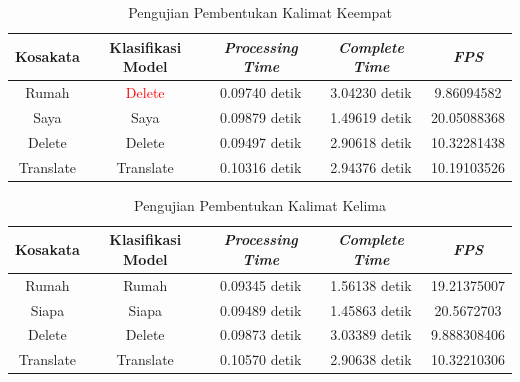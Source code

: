 \begin{longtable}{|c|c|c|c|c|}
  \caption{Pengujian Pembentukan Kalimat Keempat}
  \label{tb:prediksikombinasi4}                                   \\
  \hline
  \rowcolor[HTML]{C0C0C0}
  \textbf{Kosakata} & \textbf{Klasifikasi Model} & \textbf{\emph{Processing Time}} & \textbf{\emph{Complete Time}} & \textbf{\emph{FPS}}\\
  \hline
  Rumah             & \textcolor{red}{Delete}       & 0.09740 detik                           & 3.04230 detik                                  & 9.86094582\\
  Saya              & Saya                          & 0.09879 detik                           & 1.49619 detik                                  & 20.05088368\\
  Delete            & Delete                        & 0.09497 detik                           & 2.90618 detik                                  & 10.32281438\\
  Translate         & Translate                     & 0.10316 detik                           & 2.94376 detik                                  & 10.19103526\\
  \hline
\end{longtable}



\begin{longtable}{|c|c|c|c|c|}
  \caption{Pengujian Pembentukan Kalimat Kelima}
  \label{tb:prediksikombinasi5}                                   \\
  \hline
  \rowcolor[HTML]{C0C0C0}
  \textbf{Kosakata} & \textbf{Klasifikasi Model} & \textbf{\emph{Processing Time}} & \textbf{\emph{Complete Time}} & \textbf{\emph{FPS}}\\
  \hline
  Rumah             & Rumah                          & 0.09345 detik                           & 1.56138 detik                                  & 19.21375007\\
  Siapa             & Siapa                          & 0.09489 detik                           & 1.45863 detik                                  & 20.5672703\\
  Delete            & Delete                         & 0.09873 detik                           & 3.03389 detik                                  & 9.888308406\\
  Translate         & Translate                      & 0.10570 detik                           & 2.90638 detik                                  & 10.32210306\\
  \hline
\end{longtable}



